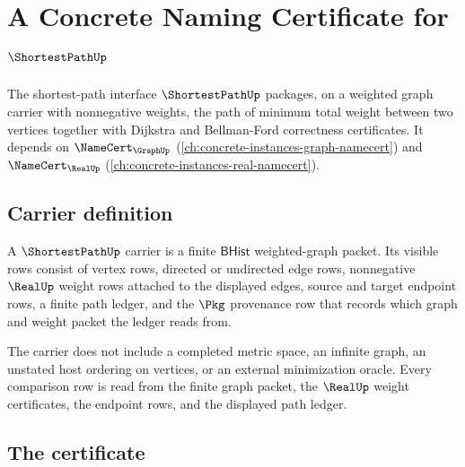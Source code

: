 \chapter{A Concrete Naming Certificate for $\ShortestPathUp$}
\label{ch:concrete-instances-shortestpath-namecert}

The shortest-path interface $\ShortestPathUp$ packages, on a weighted graph carrier with nonnegative weights, the path of minimum total weight between two vertices together with Dijkstra and Bellman-Ford correctness certificates. It depends on $\NameCert_{\GraphUp}$ (\autoref{ch:concrete-instances-graph-namecert}) and $\NameCert_{\RealUp}$ (\autoref{ch:concrete-instances-real-namecert}).

\section{Carrier definition}
\label{sec:shortestpath-carrier}

\begin{definition}
\label{def:shortestpath-bhist-weighted-graph-carrier}
A $\ShortestPathUp$ carrier is a finite $\mathsf{BHist}$ weighted-graph
packet. Its visible rows consist of vertex rows, directed or undirected edge
rows, nonnegative $\RealUp$ weight rows attached to the displayed edges, source
and target endpoint rows, a finite path ledger, and the $\Pkg$ provenance row
that records which graph and weight packet the ledger reads from.

The carrier does not include a completed metric space, an infinite graph, an
unstated host ordering on vertices, or an external minimization oracle. Every
comparison row is read from the finite graph packet, the $\RealUp$ weight
certificates, the endpoint rows, and the displayed path ledger.
\end{definition}

\section{The certificate}
\label{sec:shortestpath-certificate}

